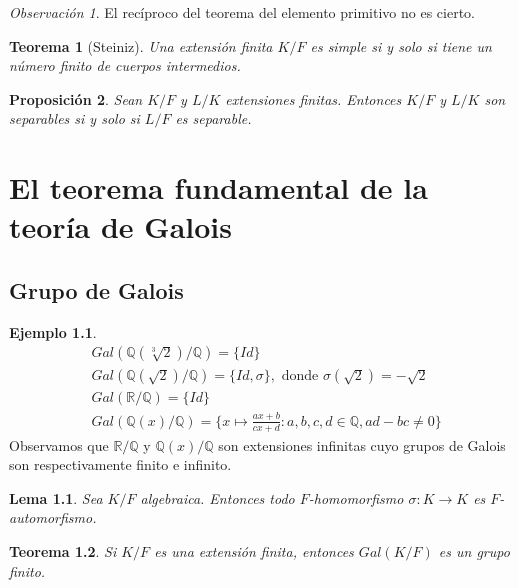 \documentclass{report}
\newtheorem{theorem}{Teorema}[chapter]
\newtheorem{lemma}[theorem]{Lema}
\newtheorem{proposition}[theorem]{Proposición}
\theoremstyle{remark}
\newtheorem*{remark}{Observación}
\theoremstyle{definition}
\theoremstyle{definition}
\theoremstyle{definition}
\newtheorem*{example}{Ejemplo}
\begin{document}
\begin{remark}
    El recíproco del teorema del elemento primitivo no es cierto.
\end{remark}

\begin{theorem}[Steiniz]
    Una extensión finita $K/F$ es simple si y solo si tiene un número finito de cuerpos intermedios.
\end{theorem}

\begin{proposition}
    Sean $K/F$ y $L/K$ extensiones finitas. Entonces $K/F$ y $L/K$ son separables si y solo si $L/F$ es separable.
\end{proposition}

\chapter{El teorema fundamental de la teoría de Galois}
\section{Grupo de Galois}

\begin{example}
    \begin{align*}
         & Gal(\mathbb{Q}(\sqrt[3]{2})/\mathbb{Q}) = \{Id\}                                                                \\
         & Gal(\mathbb{Q}(\sqrt{2})/\mathbb{Q}) = \{ Id, \sigma \}, \text{ donde } \sigma(\sqrt{2}) = -\sqrt{2}            \\
         & Gal(\mathbb{R}/\mathbb{Q}) = \{Id\}                                                                             \\
         & Gal(\mathbb{Q}(x)/\mathbb{Q}) = \{ x \mapsto \frac{ax + b}{cx + d} : a, b, c, d \in \mathbb{Q}, ad-bc \neq 0 \}
    \end{align*}
    Observamos que $\mathbb{R}/\mathbb{Q}$ y $\mathbb{Q}(x)/\mathbb{Q}$ son extensiones infinitas cuyo grupos de Galois son respectivamente finito e infinito.
\end{example}

\begin{lemma}
    Sea $K/F$ algebraica. Entonces todo $F$-homomorfismo $\sigma : K \to K$ es $F$-automorfismo.
\end{lemma}

\begin{theorem}
    Si $K/F$ es una extensión finita, entonces $Gal(K/F)$ es un grupo finito.
\end{theorem}
\end{document}
